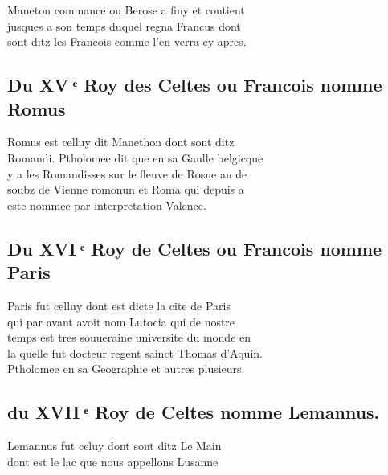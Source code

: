 \documentclass[12pt]{article}
\begin{document}
Maneton commance ou Berose a finy et contient\\
jusques a son temps duquel regna Francus
            dont\\
sont ditz les Francois comme l'en verra cy apres.





\subsection*{Du XV ͤ Roy des Celtes ou Francois nomme Romus}


Romus est celluy dit Manethon dont sont ditz\\
Romandi. Ptholomee dit que en sa Gaulle belgicque\\
y a les
          Romandisses sur le fleuve de Rosne au de\\
soubz de Vienne romonun et Roma qui
          depuis a\\
este nommee par interpretation Valence.







\newpage






\subsection*{Du XVI ͤ Roy de Celtes ou Francois nomme Paris}


Paris fut celluy dont est dicte la cite de
            Paris\\
qui par avant avoit nom Lutocia qui de nostre\\
temps est tres
          souueraine universite du monde en\\
la quelle fut docteur regent sainct Thomas d'Aquin.\\
Ptholomee en sa Geographie et autres plusieurs.





\subsection*{du XVII ͤ Roy de Celtes nomme Lemannus.}


Lemannus fut celuy dont sont ditz Le
            Main\\
dont est le lac que nous appellons Lusanne
\end{document}
